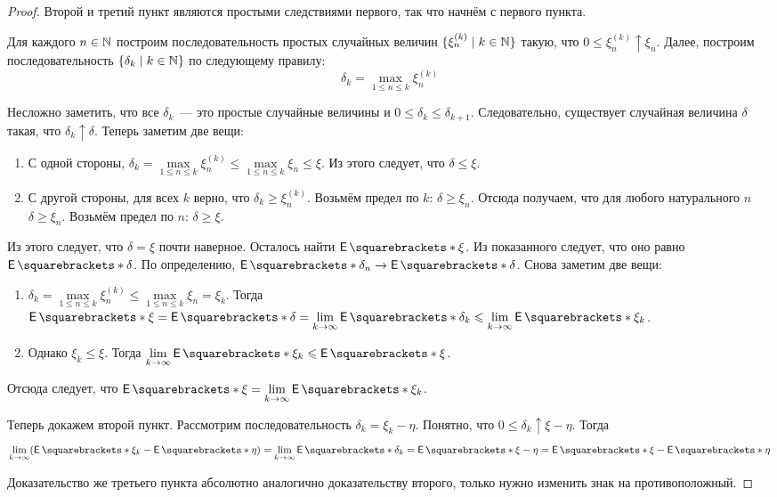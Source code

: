 \begin{proof}
	Второй и третий пункт являются простыми следствиями первого, так что начнём с первого пункта.
	
	Для каждого \(n \in \mathbb{N}\) построим последовательность простых случайных величин \(\{\xi_n^{(k)} \mid k \in \mathbb{N}\}\) такую, что \(0 \leq \xi_n^{(k)} \uparrow \xi_n\). Далее, построим последовательность \(\{\delta_k \mid k \in \mathbb{N}\}\) по следующему правилу:
	\[
		\delta_k = \max\limits_{1 \leq n \leq k} \xi_n^{(k)}
	\]
	
	Несложно заметить, что все \(\delta_{k}\)~--- это простые случайные величины и \(0 \leq \delta_k \leq \delta_{k + 1}\). Следовательно, существует случайная величина \(\delta\) такая, что \(\delta_k \uparrow \delta\). Теперь заметим две вещи:
	\begin{enumerate}
		\item С одной стороны, \(\delta_k = \max\limits_{1 \leq n \leq k} \xi_n^{(k)} \leq \max\limits_{1 \leq n \leq k} \xi_n \leq \xi\). Из этого следует, что \(\delta \leq \xi\).
		\item С другой стороны, для всех \(k\) верно, что \(\delta_k \geq \xi_n^{(k)}\). Возьмём предел по \(k\): \(\delta \geq \xi_n\). Отсюда получаем, что для любого натурального \(n\) \(\delta \geq \xi_n\). Возьмём предел по \(n\): \(\delta \geq \xi\).
	\end{enumerate}

	Из этого следует, что \(\delta = \xi\) почти наверное. Осталось найти \(\E{\xi}\). Из показанного следует, что оно равно \(\E{\delta}\). По определению, \(\E{\delta_n} \to \E{\delta}\). Снова заметим две вещи:
	\begin{enumerate}
		\item \(\delta_k = \max\limits_{1 \leq n \leq k} \xi_n^{(k)} \leq \max\limits_{1 \leq n \leq k} \xi_n = \xi_k\). Тогда \(\E{\xi} = \E{\delta} = \lim\limits_{k \to \infty} \E{\delta_k} \leq \lim\limits_{k \to \infty} \E{\xi_k}\).
		
		\item Однако \(\xi_k \leq \xi\). Тогда \(\lim\limits_{k \to \infty} \E{\xi_k} \leq \E{\xi}\).
	\end{enumerate}

	Отсюда следует, что \(\E{\xi} = \lim\limits_{k \to \infty} \E{\xi_k}\).
	
	Теперь докажем второй пункт. Рассмотрим последовательность \(\delta_{k} = \xi_{k} - \eta\). Понятно, что \(0 \leq \delta_k \uparrow \xi - \eta\). Тогда
	\[
		\lim\limits_{k \to \infty} (\E{\xi_k} - \E{\eta}) = \lim\limits_{k \to \infty} \E{\delta_k} = \E{\xi - \eta} = \E{\xi} - \E{\eta}
	\]
	
	Доказательство же третьего пункта абсолютно аналогично доказательству второго, только нужно изменить знак на противоположный.
\end{proof}

